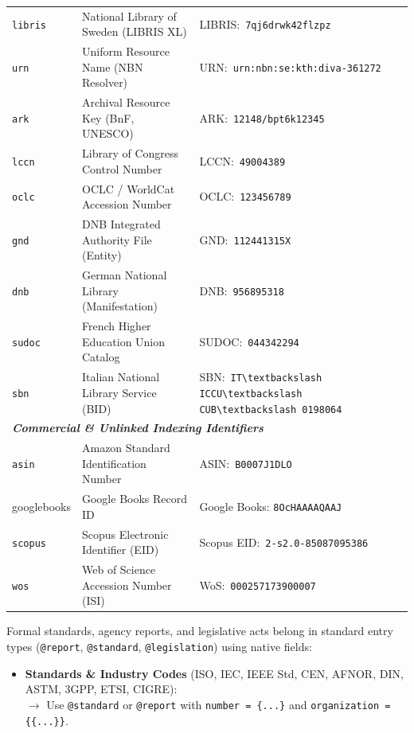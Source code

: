\documentclass[12pt, twoside]{article}
\begin{document}
\begin{description}
\begin{table}[!ht]
\begin{tabular}{p{2.8cm} | >{\raggedright\arraybackslash}p{6.8cm} | >{\raggedright\arraybackslash}p{5.2cm}}
    \texttt{libris}     & National Library of Sweden (LIBRIS XL)   & LIBRIS:\ \nolinkurl{7qj6drwk42flzpz} \\
    \texttt{urn}        & Uniform Resource Name (NBN Resolver)     & URN:\ \nolinkurl{urn:nbn:se:kth:diva-361272} \\
    \texttt{ark}        & Archival Resource Key (BnF, UNESCO)      & ARK:\ \nolinkurl{12148/bpt6k12345} \\
    \texttt{lccn}       & Library of Congress Control Number       & LCCN:\ \nolinkurl{49004389} \\
    \texttt{oclc}       & OCLC / WorldCat Accession Number         & OCLC:\ \nolinkurl{123456789} \\
    \texttt{gnd}        & DNB Integrated Authority File (Entity)   & GND:\ \nolinkurl{112441315X} \\
    \texttt{dnb}        & German National Library (Manifestation)  & DNB:\ \nolinkurl{956895318} \\
    \texttt{sudoc}      & French Higher Education Union Catalog    & SUDOC:\ \nolinkurl{044342294} \\
    \texttt{sbn}        & Italian National Library Service (BID)   & SBN:\ \nolinkurl{IT\textbackslash ICCU\textbackslash CUB\textbackslash 0198064} \\
    \hline
    \multicolumn{3}{l}{\textbf{\textit{Commercial \& Unlinked Indexing Identifiers}}} \\
    \texttt{asin}       & Amazon Standard Identification Number    & ASIN:\ \nolinkurl{B0007J1DLO} \\
    googlebooks & Google Books Record ID & Google Books: \nolinkurl{8OcHAAAAQAAJ} \\
    \texttt{scopus}     & Scopus Electronic Identifier (EID)       & Scopus EID:\ \nolinkurl{2-s2.0-85087095386} \\
    \nolinkurl{wos}        & Web of Science Accession Number (ISI)    & WoS:\ \nolinkurl{000257173900007} \\
    \hline
  \end{tabular}
\end{table}

    \item[Tier 3: Document Series \& Formal Specifications] Formal standards, agency reports, and legislative acts belong in standard entry types (\texttt{@report}, \texttt{@standard}, \texttt{@legislation}) using native fields:
    \begin{itemize}
        \item \textbf{Standards \& Industry Codes} (ISO, IEC, IEEE Std, CEN, AFNOR, DIN, ASTM, 3GPP, ETSI, CIGRE):\\
        $\rightarrow$ Use \texttt{@standard} or \texttt{@report} with \texttt{number = \{...\}} and \texttt{organization = \{\{...\}\}}.
        

\end{itemize}
\end{description}
\end{document}
